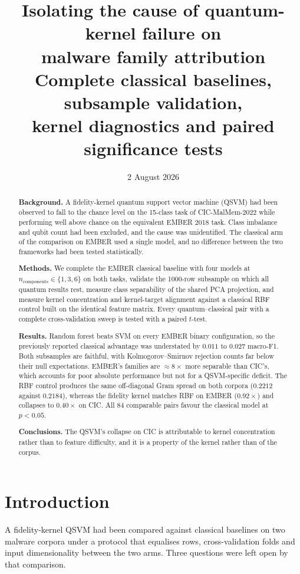 \documentclass[11pt]{article}
\title{Isolating the cause of quantum-kernel failure on\\
malware family attribution\\[0.3em]
\large Complete classical baselines, subsample validation,\\
kernel diagnostics and paired significance tests}
\date{2 August 2026}
\newcommand{\nc}{\ensuremath{n_{\mathrm{components}}}}
\begin{document}
\maketitle

\begin{abstract}
\noindent
\textbf{Background.} A fidelity-kernel quantum support vector machine (QSVM) had
been observed to fall to the chance level on the 15-class task of CIC-MalMem-2022
while performing well above chance on the equivalent EMBER 2018 task. Class
imbalance and qubit count had been excluded, and the cause was unidentified. The
classical arm of the comparison on EMBER used a single model, and no difference
between the two frameworks had been tested statistically.

\noindent
\textbf{Methods.} We complete the EMBER classical baseline with four models at
$\nc{} \in \{1,3,6\}$ on both tasks, validate the 1000-row subsample on which all
quantum results rest, measure class separability of the shared PCA projection,
and measure kernel concentration and kernel-target alignment against a classical
RBF control built on the identical feature matrix. Every quantum--classical pair
with a complete cross-validation sweep is tested with a paired $t$-test.

\noindent
\textbf{Results.} Random forest beats SVM on every EMBER binary configuration, so
the previously reported classical advantage was understated by $0.011$ to
$0.027$ macro-F1. Both subsamples are faithful, with Kolmogorov--Smirnov
rejection counts far below their null expectations. EMBER's families are
$\approx 8\times$ more separable than CIC's, which accounts for poor absolute
performance but not for a QSVM-specific deficit. The RBF control produces the
same off-diagonal Gram spread on both corpora ($0.2212$ against $0.2184$),
whereas the fidelity kernel matches RBF on EMBER ($0.92\times$) and collapses to
$0.40\times$ on CIC. All 84 comparable pairs favour the classical model at
$p<0.05$.

\noindent
\textbf{Conclusions.} The QSVM's collapse on CIC is attributable to kernel
concentration rather than to feature difficulty, and it is a property of the
kernel rather than of the corpus.
\end{abstract}

\section{Introduction}

A fidelity-kernel QSVM had been compared against classical baselines on two
malware corpora under a protocol that equalises rows, cross-validation folds and
input dimensionality between the two arms. Three questions were left open by that
comparison.
\end{document}
